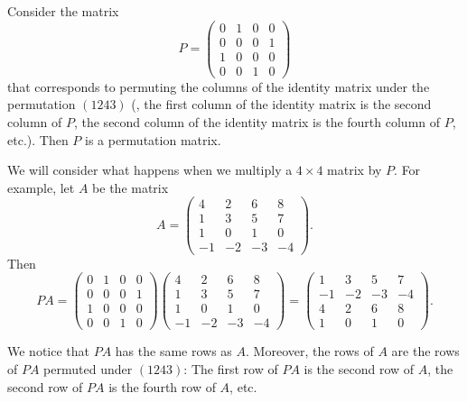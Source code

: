 \documentclass[12pt]{article}
\begin{document}

Consider the matrix
\[
P=\begin{pmatrix}
0 & 1 & 0 & 0 \\
0 & 0 & 0 & 1 \\
1 & 0 & 0 & 0 \\
0 & 0 & 1 & 0
\end{pmatrix}
\]
that corresponds to permuting the columns of the identity matrix under the permutation $(1 2 4 3)$ (, the first column of the identity matrix is the second column of $P$, the second column of the identity matrix is the fourth column of $P$, etc.).  Then $P$ is a permutation matrix.

We will consider what happens when we multiply a $4\times 4$ matrix by $P$.  For example, let $A$ be the matrix
\[
A=\begin{pmatrix}
4 & 2 & 6 & 8 \\
1 & 3 & 5 & 7 \\
1 & 0 & 1 & 0 \\
-1& -2& -3& -4
\end{pmatrix}.
\]
Then
\[
PA=\begin{pmatrix}
0 & 1 & 0 & 0 \\
0 & 0 & 0 & 1 \\
1 & 0 & 0 & 0 \\
0 & 0 & 1 & 0
\end{pmatrix}
\begin{pmatrix}
4 & 2 & 6 & 8 \\
1 & 3 & 5 & 7 \\
1 & 0 & 1 & 0 \\
-1& -2& -3&-4
\end{pmatrix}
= 
\begin{pmatrix}
1 & 3 & 5 & 7 \\
-1& -2& -3&-4 \\
4 & 2 & 6 & 8 \\
1 & 0 & 1 & 0
\end{pmatrix}.
\]

We notice that $PA$ has the same rows as $A$.  Moreover, the rows of $A$ are the rows of $PA$ permuted under $(1 2 4 3)$: The first row of $PA$ is the second row of $A$, the second row of $PA$ is the fourth row of $A$, etc.
\end{document}
